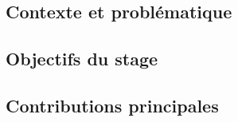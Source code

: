 
\subsection{Contexte et problématique}\label{ssec:introduction_contexte_problematique}



\subsection{Objectifs du stage}\label{ssec:introduction_objectifs}



\subsection{Contributions principales}\label{ssec:introduction_contributions}

